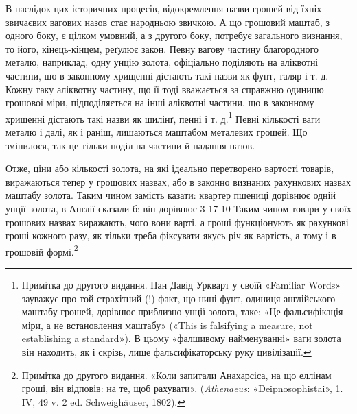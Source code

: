 В наслідок цих історичних процесів, відокремлення назви
грошей від їхніх звичаєвих вагових назов стає народньою звичкою.
А що грошовий маштаб, з одного боку, є цілком умовний,
а з другого боку, потребує загального визнання, то його, кінець-кінцем,
реґулює закон. Певну вагову частину благородного
металю, наприклад, одну унцію золота, офіціально поділяють
на аліквотні частини, що в законному хрищенні дістають
такі назви як фунт, таляр і т. д. Кожну таку аліквотну частину,
що її тоді вважається за справжню одиницю грошової міри, підподіляється
на інші аліквотні частини, що в законному хрищенні
дістають такі назви як шилінґ, пенні і т. д.\footnote{
Примітка до другого видання. Пан Давід Уркварт у своїй «Familiar
Words» зауважує про той страхітний (!) факт, що нині фунт, одиниця
англійського маштабу грошей, дорівнює приблизно  унції золота, таке:
«Це фальсифікація міри, а не встановлення маштабу» («This is falsifying
a measure, not establishing a standard»). В цьому «фалшивому
найменуванні» ваги золота він находить, як і скрізь, лише фальсифікаторську
руку цивілізації.
} Певні кількості ваги
металю і далі, як і раніш, лишаються маштабом металевих грошей.
Що змінилося, так це тільки поділ на частини й надання назов.

Отже, ціни або кількості золота, на які ідеально перетворено
вартості товарів, виражаються тепер у грошових назвах, або в
законно визнаних рахункових назвах маштабу золота. Таким
чином замість казати: квартер пшениці дорівнює одній унції
золота, в Англії сказали б: він дорівнює 3
17 10 Таким чином товари у своїх грошових
назвах виражають, чого вони варті, а гроші функціонують як
рахункові гроші кожного разу, як тільки треба фіксувати якусь
річ як вартість, а тому і в грошовій формі.\footnote{
Примітка до другого видання. «Коли запитали Анахарсіса, на що
еллінам гроші, він відповів: на те, щоб рахувати». (\emph{Athenaeus}: «Deipnosophistai»,
1. IV, 49 v. 2 ed. Schweighäuser, 1802).
}

